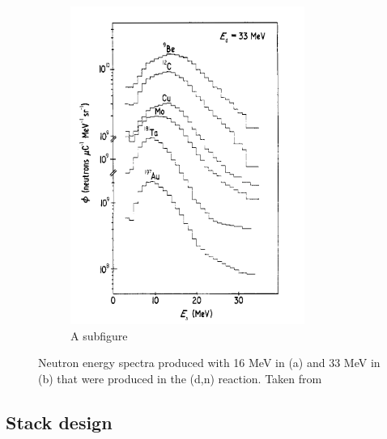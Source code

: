 \documentclass[twoside,english]{uiofysmaster/uiofysmaster}
\begin{document}
\begin{figure} [h!]
\begin{subfigure}{.5\textwidth}
  	\includegraphics[width=.95\linewidth]{meulders_33.png}
  		\caption{A subfigure}
  		\label{fig:energy_33}
	\end{subfigure}
 \caption{Neutron energy spectra produced with 16 MeV in (a) and 33 MeV in (b) that were produced in the (d,n) reaction. Taken from \citep{Meulders}}
 \label{fig:meulders_energydistribution}
\end{figure}
\noindent




\subsection{Stack design}
\label{sec: stack_design}
\end{document}
